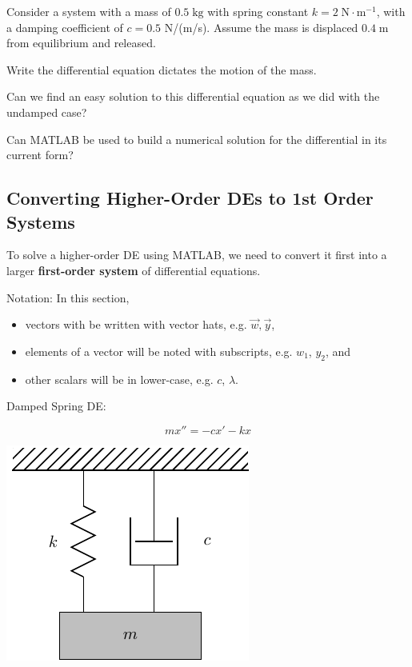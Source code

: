 \newpage
\problem Consider a system with a mass of $0.5 \; \text{kg}$ with
spring constant $k = 2 \; \text{N} \cdot \text{m}^{-1}$, with a
damping coefficient of $c = 0.5$ N/(m/s).  Assume the mass is
displaced $0.4 \; \text{m}$ from equilibrium and released.

\problem Write the differential equation dictates the motion of the
mass.

\vspace{1in}

Can we find an easy solution to this differential equation as we did with the undamped
case?
\vfill


Can MATLAB be used to build a numerical solution for the differential
in its current form?

\vfill

\newpage


\subsection*{Converting Higher-Order DEs to 1st Order Systems}
To solve a higher-order DE using MATLAB, we need to convert it first
into a larger {\bf first-order system} of differential equations.


\vspace{0.3in}
Notation: In this section, 
\begin{itemize} 
\item vectors with be written with vector hats, e.g.
  $\vec{w}, \vec{y}$,
\item elements of a vector will be noted with subscripts, e.g. $w_1$,
  $y_2$, and
\item other scalars will be in lower-case, e.g. $c$, $\lambda$.
\end{itemize}

\newpage

\begin{minipage}[t]{0.4\linewidth}
\vspace{0pt}
Damped Spring DE:

$$ m x'' = -c x' -kx $$
\end{minipage}
\begin{minipage}[t]{0.6\linewidth}
\vspace{0pt}
\begin{center}
\includegraphics[width=0.5\linewidth]{graphics/notes_08_hanging_mass}
\end{center}
\end{minipage}


